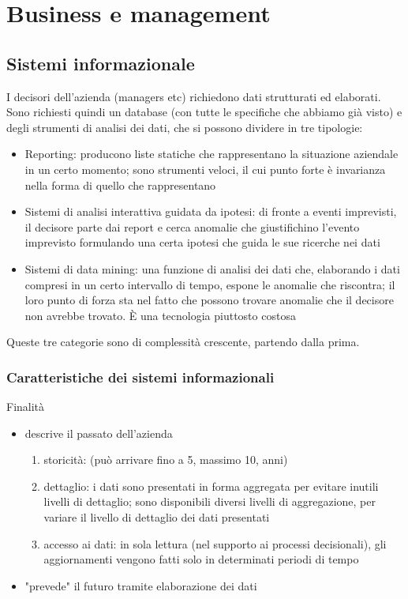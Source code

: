 \chapter{Business e management}
\label{chap:Business e management}

\section{Sistemi informazionale}
\label{sec:Sistemi informazionale}
I decisori dell'azienda (managers etc) richiedono dati strutturati ed elaborati.
Sono richiesti quindi un database (con tutte le specifiche che abbiamo gi\`a visto) e degli strumenti di analisi dei dati, che si possono dividere in tre tipologie:
\begin{itemize}
  \item Reporting: producono liste statiche che rappresentano la situazione aziendale in un certo momento; sono strumenti veloci, il cui punto forte \`e invarianza nella forma di quello che rappresentano
  \item Sistemi di analisi interattiva guidata da ipotesi: di fronte a eventi imprevisti, il decisore parte dai report
  e cerca anomalie che giustifichino l'evento imprevisto formulando una certa ipotesi che guida
  le sue ricerche nei dati
  \item Sistemi di data mining: una funzione di analisi dei dati che, elaborando i dati compresi in un certo intervallo
  di tempo, espone le anomalie che riscontra; il loro punto di forza sta nel fatto che possono trovare anomalie che
  il decisore non avrebbe trovato. \`E una tecnologia piuttosto costosa
\end{itemize}
Queste tre categorie sono di complessit\`a crescente, partendo dalla prima.

\subsection{Caratteristiche dei sistemi informazionali}
\label{sub:Caratteristiche dei sistemi informazionali}
Finalit\`a
\begin{itemize}
  \item descrive il passato dell'azienda
  \begin{enumerate}
    \item storicit\`a: (pu\`o arrivare fino a 5, massimo 10, anni)
    \item dettaglio: i dati sono presentati in forma aggregata per evitare inutili
    livelli di dettaglio; sono disponibili diversi livelli di aggregazione, per variare
    il livello di dettaglio dei dati presentati
    \item accesso ai dati: in sola lettura (nel supporto ai processi decisionali),
    gli aggiornamenti vengono fatti solo in determinati periodi di tempo
  \end{enumerate}
  \item "prevede" il futuro tramite elaborazione dei dati
\end{itemize}
